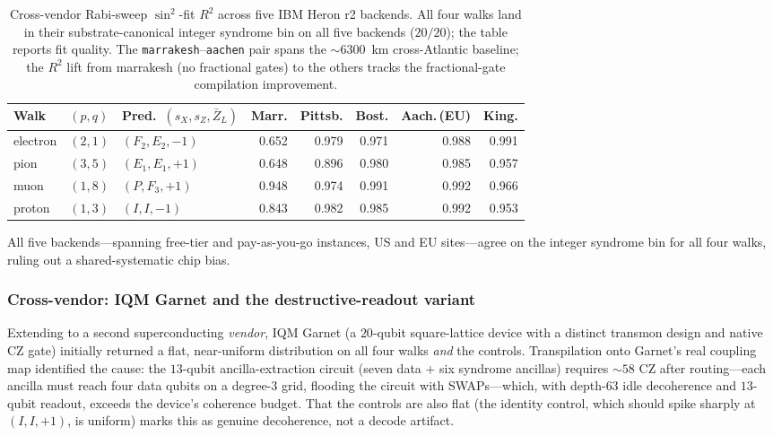 \documentclass[11pt]{article}
\newcommand{\barZ}{\bar Z_L}
\begin{document}
\begin{table}[H]
\centering
\caption{Cross-vendor Rabi-sweep $\sin^2$-fit $R^2$ across five IBM Heron r2 backends.  All four walks land in their substrate-canonical integer syndrome bin on all five backends ($20/20$); the table reports fit quality.  The \texttt{marrakesh}--\texttt{aachen} pair spans the $\sim 6300$~km cross-Atlantic baseline; the $R^2$ lift from marrakesh (no fractional gates) to the others tracks the fractional-gate compilation improvement.}
\label{tab:phase28e-heron}
\small
\begin{tabular}{lllrrrrr}
\toprule
Walk & $(p, q)$ & Pred.\ $(s_X, s_Z, \barZ)$ & Marr. & Pittsb. & Bost. & Aach.\,(EU) & King. \\
\midrule
electron & $(2, 1)$ & $(F_2, E_2, -1)$ & 0.652 & 0.979 & 0.971 & 0.988 & 0.991 \\
pion     & $(3, 5)$ & $(E_1, E_1, +1)$ & 0.648 & 0.896 & 0.980 & 0.985 & 0.957 \\
muon     & $(1, 8)$ & $(P, F_3, +1)$   & 0.948 & 0.974 & 0.991 & 0.992 & 0.966 \\
proton   & $(1, 3)$ & $(I, I, -1)$     & 0.843 & 0.982 & 0.985 & 0.992 & 0.953 \\
\bottomrule
\end{tabular}
\end{table}

All five backends---spanning free-tier and pay-as-you-go instances, US and EU sites---agree on the integer syndrome bin for all four walks, ruling out a shared-systematic chip bias.

\subsubsection{Cross-vendor: IQM Garnet and the destructive-readout variant}
\label{sec:phase28e-garnet}

Extending to a second superconducting \emph{vendor}, IQM Garnet (a $20$-qubit square-lattice device with a distinct transmon design and native CZ gate) initially returned a flat, near-uniform distribution on all four walks \emph{and} the controls.  Transpilation onto Garnet's real coupling map identified the cause: the $13$-qubit ancilla-extraction circuit (seven data $+$ six syndrome ancillas) requires $\sim 58$ CZ after routing---each ancilla must reach four data qubits on a degree-3 grid, flooding the circuit with SWAPs---which, with depth-$63$ idle decoherence and $13$-qubit readout, exceeds the device's coherence budget.  That the controls are also flat (the identity control, which should spike sharply at $(I, I, +1)$, is uniform) marks this as genuine decoherence, not a decode artifact.
\end{document}
